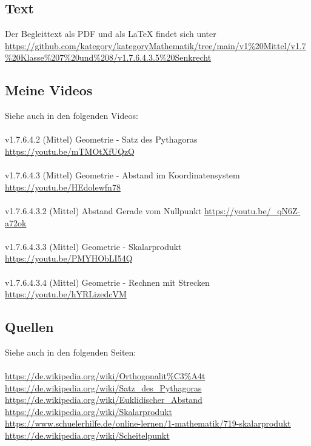 \documentclass[a4paper]{amsart}
\theoremstyle{definition}
\begin{document}
\subsection*{Text}
Der Begleittext als PDF und als LaTeX findet sich unter
{\tiny
   \url{https://github.com/kategory/kategoryMathematik/tree/main/v1%20Mittel/v1.7%20Klasse%207%20und%208/v1.7.6.4.3.5%20Senkrecht}
}

\subsection*{Meine Videos}
Siehe auch in den folgenden Videos:\\
\\
v1.7.6.4.2 (Mittel) Geometrie - Satz des Pythagoras\\
\url{https://youtu.be/mTMOtXfUQzQ}\\
\\
v1.7.6.4.3 (Mittel) Geometrie - Abstand im Koordinatensystem\\
\url{https://youtu.be/HEdolewfn78}
\\
\\v1.7.6.4.3.2 (Mittel) Abstand Gerade vom Nullpunkt
\url{https://youtu.be/_qN6Z-a72ok}
\\
\\v1.7.6.4.3.3 (Mittel) Geometrie - Skalarprodukt
\url{https://youtu.be/PMYHObLI54Q}
\\
\\v1.7.6.4.3.4 (Mittel) Geometrie - Rechnen mit Strecken
\url{https://youtu.be/hYRLizedcVM}

\subsection*{Quellen}
Siehe auch in den folgenden Seiten:\\
\\
\url{https://de.wikipedia.org/wiki/Orthogonalit%C3%A4t}\\
\url{https://de.wikipedia.org/wiki/Satz_des_Pythagoras}\\
\url{https://de.wikipedia.org/wiki/Euklidischer_Abstand}\\
\url{https://de.wikipedia.org/wiki/Skalarprodukt}\\
\url{https://www.schuelerhilfe.de/online-lernen/1-mathematik/719-skalarprodukt}\\
\url{https://de.wikipedia.org/wiki/Scheitelpunkt}
\end{document}
